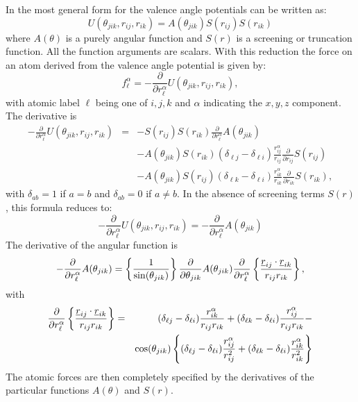 In \D{} the most general form for the valence
angle
potentials can be written as:
\begin{equation}
U(\theta_{jik},r_{ij},r_{ik})=A(\theta_{jik})S(r_{ij})S(r_{ik})
\end{equation}
where $A(\theta)$ is a purely angular function and $S(r)$ is a
screening or truncation function. All the function arguments are
scalars.  With this reduction the force on an atom derived from the
valence angle potential is given by:
\begin{equation}
f_{\ell}^{\alpha}=-\frac{\partial}{\partial
r_{\ell}^{\alpha}}U(\theta_{jik},r_{ij},r_{ik}),
\end{equation}
with atomic label $\ell$ being one of $i,j,k$ and $\alpha$ indicating the
$x,y,z$ component. The derivative is
\begin{eqnarray}
-\frac{\partial}{\partial
r_{\ell}^{\alpha}}U(\theta_{jik},r_{ij},r_{ik})&=&
-S(r_{ij})S(r_{ik})\frac{\partial}{\partial
r_{\ell}^{\alpha}}A(\theta_{jik}) \nonumber \\ & & -
A(\theta_{jik})S(r_{ik})(\delta_{\ell j}-\delta_{\ell i})
\frac{r_{ij}^{\alpha}}{r_{ij}}
\frac{\partial}{\partial r_{ij}}S(r_{ij})\nonumber \\
& & - A(\theta_{jik})S(r_{ij})(\delta_{\ell k}-\delta_{\ell i})
\frac{r_{ik}^{\alpha}}{r_{ik}}
\frac{\partial}{\partial r_{ik}}S(r_{ik}),
\end{eqnarray}
with $\delta_{ab}=1$ if $a=b$ and $\delta_{ab}=0$ if $a\ne b$. In the
absence of screening terms $S(r)$, this formula reduces to:
\begin{equation}
-\frac{\partial}{\partial
r_{\ell}^{\alpha}}U(\theta_{jik},r_{ij},r_{ik})=
-\frac{\partial}{\partial r_{\ell}^{\alpha}}A(\theta_{jik})
\end{equation}
The derivative of the angular function is
\begin{equation}
-\frac{\partial}{\partial r_{\ell}^{\alpha}}A(\theta_{jik})=
\left\{\frac{1}{\sin(\theta_{jik})}\right\}
\frac{\partial}{\partial \theta_{jik}}A(\theta_{jik})
\frac{\partial}{\partial r_{\ell}^{\alpha}}\left\{
\frac{\mbox{$\underline{r}$}_{ij}\cdot\mbox{$\underline{r}$}_{ik}}{r_{ij}r_{ik}}\right\},
\end{equation}
with
\begin{eqnarray}
\frac{\partial}{\partial r_{\ell}^{\alpha}}\left\{
\frac{\mbox{$\underline{r}$}_{ij}\cdot\mbox{$\underline{r}$}_{ik}}{r_{ij}r_{ik}}\right\}&=&
(\delta_{\ell j}-\delta_{\ell i})\frac{r_{ik}^{\alpha}}{r_{ij}r_{ik}}+
(\delta_{\ell k}-\delta_{\ell
i})\frac{r_{ij}^{\alpha}}{r_{ij}r_{ik}}-\nonumber \\ & &
\cos(\theta_{jik})
\left\{(\delta_{\ell j}-\delta_{\ell
i})\frac{r_{ij}^{\alpha}}{r_{ij}^{2}}+
(\delta_{\ell k}-\delta_{\ell
i})\frac{r_{ik}^{\alpha}}{r_{ik}^{2}}\right\}
\end{eqnarray}
The atomic forces are then completely specified by the derivatives of
the particular functions $A(\theta)$ and $S(r)$.

